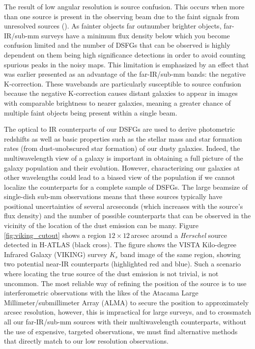 The result of low angular resolution is source confusion. This occurs when more than one source is present in the observing beam due to the faint signals from unresolved sources (\citealt{Condon_1974}). As fainter objects far outnumber brighter objects, far-IR/sub-mm surveys have a minimum flux density below which you become confusion limited and the number of DSFGs that can be observed is highly dependent on them being high significance detections in order to avoid counting spurious peaks in the noisy maps. This limitation is emphasized by an effect that was earlier presented as an advantage of the far-IR/sub-mm bands: the negative K-correction. These wavebands are particularly susceptible to source confusion because the negative K-correction causes distant galaxies to appear in images with comparable brightness to nearer galaxies, meaning a greater chance of multiple faint objects being present within a single beam.

The optical to IR counterparts of our DSFGs are used to derive photometric redshifts as well as basic properties such as the stellar mass and star formation rates (from dust-unobscured star formation) of our dusty galaxies. Indeed, the multiwavelength view of a galaxy is important in obtaining a full picture of the galaxy population and their evolution. However, characterizing our galaxies at other wavelengths could lead to a biased view of the population if we cannot localize the counterparts for a complete sample of DSFGs. The large beamsize of single-dish sub-mm observations means that these sources typically have positional uncertainties of several arcseconds (which increases with the source's flux density) and the number of possible counterparts that can be observed in the vicinity of the location of the dust emission can be many. Figure \ref{fig:viking_cutout} shows a region $12\times12\,$arcsec around a \textit{Herschel} source detected in H-ATLAS (black cross). The figure shows the VISTA Kilo-degree Infrared Galaxy (VIKING) survey $K_s$ band image of the same region, showing two potential near-IR counterparts (highlighted red and blue). Such a scenario where locating the true source of the dust emission is not trivial, is not uncommon. The most reliable way of refining the position of the source is to use interferometric observations with the likes of the Atacama Large Millimeter/submillimeter Array (ALMA) to secure the position to approximately arcsec resolution, however, this is impractical for large surveys, and to crossmatch all our far-IR/sub-mm sources with their multiwavelength counterparts, without the use of expensive, targeted observations, we must find alternative methods that directly match to our low resolution observations.

